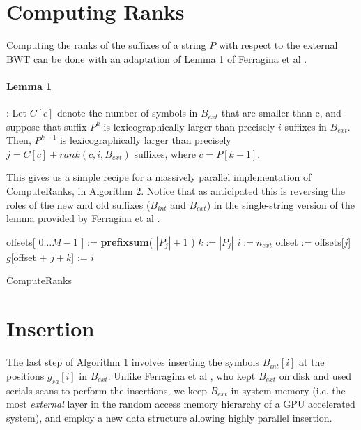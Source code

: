 \documentclass{acmsiggraph}
\begin{document}
\section{Computing Ranks}

Computing the ranks of the suffixes of a string $P$ with respect to the external BWT can be done
with an adaptation of Lemma 1 of Ferragina et al .
\paragraph{Lemma 1}: Let $C[c]$ denote the number of symbols in $B_{ext}$ that are smaller
than c, and suppose that suffix $P^k$ is lexicographically larger than precisely $i$ suffixes in $B_{ext}$.
Then, $P^{k-1}$ is lexicographically larger than precisely $j = C[c] + rank(c,i,B_{ext})$ suffixes, where
$c = P[k-1].$

This gives us a simple recipe for a massively parallel implementation of ComputeRanks, in Algorithm 2.
Notice that as anticipated this is reversing the roles of the new and old suffixes ($B_{int}$ and $B_{ext}$)
in the single-string version of the lemma provided by Ferragina et al .


\begin{algorithm}
offsets[ $0 \dots M-1$ ]  := {\bf prefixsum}( $|P_j|+1$ )\;
 {
  $k := |P_j|$\;
  $i := n_{ext}$\;
  offset := offsets[$j$]\;
  $g$[offset + $j + k$] := $i$\;
}
\caption{ComputeRanks}
\end{algorithm}

\section{Insertion}

The last step of Algorithm 1 involves inserting the symbols $B_{int}[i]$ at the positions $g_{sa}[i]$ in $B_{ext}$. Unlike Ferragina et al , who kept $B_{ext}$ on disk and used serials scans to perform the insertions, we keep $B_{ext}$ in system memory (i.e. the most \emph{external} layer in the random access memory hierarchy of a GPU accelerated system), and employ a new data structure allowing highly parallel insertion.

\renewcommand{\arraystretch}{1.3}
\end{document}

